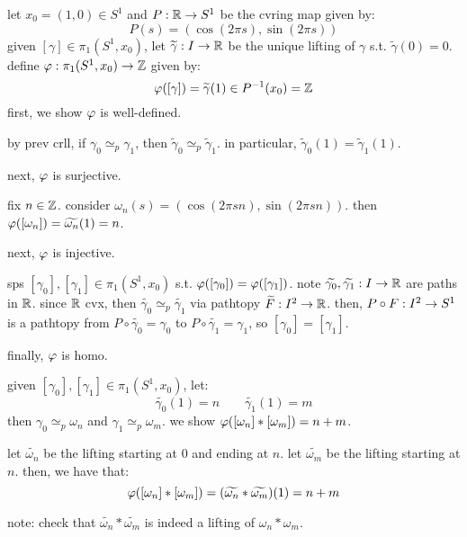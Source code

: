 let $x_{0}=(1,0)\in S^{1}$ and $P:\mathbb{R}\rightarrow S^{1}$ be the cvring map given by:
\begin{equation*}
    P(s) = (\cos(2\pi s),\sin(2\pi s))
\end{equation*}
given $[\gamma]\in\pi_{1}(S^{1},x_{0})$, let $\widetilde{\gamma}:I\rightarrow\mathbb{R}$ be the unique lifting of
$\gamma$ s.t. $\tilde{\gamma}(0)=0$.
define $\varphi:\pi_{1}(S^{1},x_{0})\rightarrow\mathbb{Z}$ given by:
\begin{equation*}
    \varphi([\gamma]) = \widetilde{\gamma}(1)\in P^{-1}(x_{0})=\mathbb{Z}
\end{equation*}
first, we show $\varphi$ is well-defined.
\begin{block}
    by prev crll, if $\gamma_{0}\simeq_{p}\gamma_{1}$, then
    $\tilde{\gamma}_{0}\simeq_{p}\tilde{\gamma}_{1}$.
    in particular, $\tilde{\gamma}_{0}(1)=\tilde{\gamma}_{1}(1)$.
\end{block}
next, $\varphi$ is surjective.
\begin{block}
    fix $n \in\mathbb{Z}$. consider $\omega_{n}(s)=(\cos(2\pi sn),\sin(2\pi sn))$.
    then $\varphi([\omega_{n}])=\widetilde{\omega_{n}}(1)=n$.
\end{block}
next, $\varphi$ is injective.
\begin{block}
    sps $[\gamma_{0}],[\gamma_{1}]\in\pi_{1}(S^{1},x_{0})$ s.t.
    $\varphi([\gamma_{0}])=\varphi([\gamma_{1}])$.
    note $\widetilde{\gamma_{0}},\widetilde{\gamma_{1}}:I\rightarrow\mathbb{R}$ are paths in $\mathbb{R}$.
    since $\mathbb{R}$ cvx, then $\tilde{\gamma_{0}}\simeq_{p}\tilde{\gamma_{1}}$ via pathtopy
    $\widetilde{F}:I^{2}\rightarrow\mathbb{R}$.
    then, $P\circ F:I^{2}\rightarrow S^{1}$ is a pathtopy from $P\circ\tilde{\gamma_{0}}=\gamma_{0}$ to
    $P\circ\tilde{\gamma_{1}}=\gamma_{1}$, so $[\gamma_{0}]=[\gamma_{1}]$.
\end{block}
finally, $\varphi$ is homo.
\begin{block}
    given $[\gamma_{0}],[\gamma_{1}]\in\pi_{1}(S^{1},x_{0})$, let:
    \begin{equation*}
        \tilde{\gamma_{0}}(1) = n \qquad \tilde{\gamma_{1}}(1) = m
    \end{equation*}
    then $\gamma_{0}\simeq_{p}\omega_{n}$ and $\gamma_{1}\simeq_{p}\omega_{m}$.
    we show $\varphi([\omega_{n}]*[\omega_{m}])=n+m$.

    let $\tilde{\omega_{n}}$ be the lifting starting at $0$ and ending at $n$.
    let $\tilde{\omega_{m}}$ be the lifting starting at $n$. then, we have that:
    \begin{equation*}
        \varphi([\omega_{n}]*[\omega_{m}])=(\widetilde{\omega_{n}}*\widetilde{\omega_{m}})(1)=n+m
    \end{equation*}
\end{block}
note: check that $\tilde{\omega_{n}}*\tilde{\omega_{m}}$ is indeed a lifting of
$\omega_{n}*\omega_{m}$.




